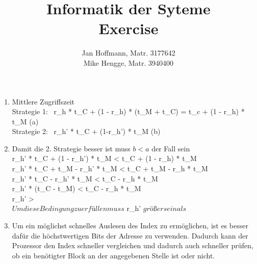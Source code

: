 \documentclass[10pt,a4paper]{article}
\title{Informatik der Syteme \\ Exercise \exnum}
\author{Jan Hoffmann, Matr. 3177642 \\ Mike Hengge,  Matr. 3940400}
\begin{document}
\section{}\label{sec:10.1}
	\begin{enumerate}
		\item Mittlere Zugriffszeit \\
					Strategie 1: \ r_h * t_C + (1 - r_h) * (t_M + t_C) = t_c + (1 - r_h) * t_M \Rightarrow    (a) \\
					Strategie 2: \ r_h' * t_C + (1-r_h') * t_M \Rightarrow (b) 
		
		\item Damit die 2. Strategie besser ist muss $b < a$ der Fall sein\\
					\Rightarrow r_h' * t_C + (1 - r_h') * t_M < t_C + (1 - r_h) * t_M \\
					\Rightarrow r_h' * t_C + t_M - r_h' * t_M < t_C + t_M - r_h * t_M \\
					\Rightarrow r_h' * t_C - r_h' * t_M < t_C - r_h * t_M \\
					\Rightarrow r_h' * (t_C - t_M) < t_C - r_h * t_M \\
					\Rightarrow r_h' >  \\ 
					\Rightarrow $Um diese Bedingung zu erfüllen muss $ r_h' $ größer sein als $ 
					
		\item Um ein möglichst schnelles Auslesen des Index zu ermöglichen, ist es besser dafür die höchstwertigen Bits der Adresse zu verwenden. Dadurch kann der Prozessor den Index schneller vergleichen und dadurch auch schneller prüfen, ob ein benötigter Block an der angegebenen Stelle ist oder nicht.
		
											
	\end{enumerate}
\end{document}
